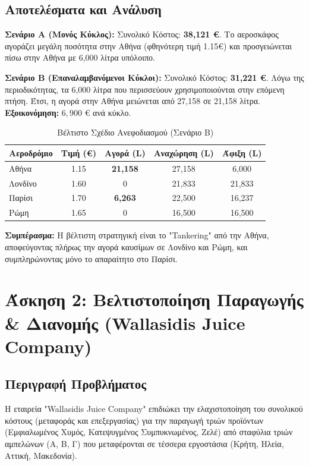 \documentclass[12pt, a4paper]{article}
\begin{document}
\subsection{Αποτελέσματα και Ανάλυση}

\textbf{Σενάριο Α (Μονός Κύκλος):}
Συνολικό Κόστος: \textbf{38,121 €}.
Το αεροσκάφος αγοράζει μεγάλη ποσότητα στην Αθήνα (φθηνότερη τιμή 1.15€) και προσγειώνεται πίσω στην Αθήνα με 6,000 λίτρα υπόλοιπο.

\textbf{Σενάριο Β (Επαναλαμβανόμενοι Κύκλοι):}
Συνολικό Κόστος: \textbf{31,221 €}.
Λόγω της περιοδικότητας, τα 6,000 λίτρα που περισσεύουν χρησιμοποιούνται στην επόμενη πτήση. Έτσι, η αγορά στην Αθήνα μειώνεται από 27,158 σε 21,158 λίτρα.
\textbf{Εξοικονόμηση:} $6,900$ € ανά κύκλο.

\begin{table}[h]
\centering
\caption{Βέλτιστο Σχέδιο Ανεφοδιασμού (Σενάριο Β)}
\begin{tabular}{lcccc}
\toprule
\textbf{Αεροδρόμιο} & \textbf{Τιμή (€)} & \textbf{Αγορά (L)} & \textbf{Αναχώρηση (L)} & \textbf{Άφιξη (L)} \\
\midrule
Αθήνα & 1.15 & \textbf{21,158} & 27,158 & 6,000 \\
Λονδίνο & 1.60 & 0 & 21,833 & 21,833 \\
Παρίσι & 1.70 & \textbf{6,263} & 22,500 & 16,237 \\
Ρώμη & 1.65 & 0 & 16,500 & 16,500 \\
\bottomrule
\end{tabular}
\end{table}

\textbf{Συμπέρασμα:} Η βέλτιστη στρατηγική είναι το "Tankering" από την Αθήνα, αποφεύγοντας πλήρως την αγορά καυσίμων σε Λονδίνο και Ρώμη, και συμπληρώνοντας μόνο το απαραίτητο στο Παρίσι.


\section*{Άσκηση 2: Βελτιστοποίηση Παραγωγής & Διανομής (Wallasidis Juice Company)}

\subsection*{Περιγραφή Προβλήματος}
Η εταιρεία "Wallasidis Juice Company" επιδιώκει την ελαχιστοποίηση του συνολικού κόστους (μεταφοράς και επεξεργασίας) για την παραγωγή τριών προϊόντων (Εμφιαλωμένος Χυμός, Κατεψυγμένος Συμπυκνωμένος, Ζελέ) από σταφύλια τριών αμπελώνων (Α, Β, Γ) που μεταφέρονται σε τέσσερα εργοστάσια (Κρήτη, Ηλεία, Αττική, Μακεδονία).
\end{document}
